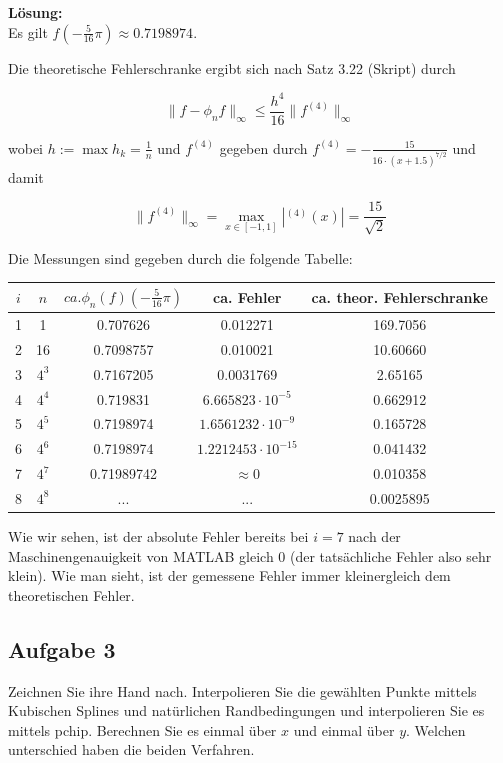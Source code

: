 \documentclass[11pt,a4paper,ngerman]{article}
\begin{document}
\textbf{Lösung:}\\
Es gilt $f(-\frac{5}{16} \pi) \approx 0.7198974$.

Die theoretische Fehlerschranke ergibt sich nach Satz 3.22 (Skript) durch

$$\| f - \phi_n f \|_{\infty} \leq \frac{h^4}{16} \|f^{(4)} \|_{\infty} $$

wobei $h := \max h_k = \frac{1}{n}$ und $f^{(4)}$ gegeben durch
$f^{(4)} = - \frac{15}{16 \cdot (x + 1.5)^{7/2}}$ und damit 

$$ \| f^{(4)} \|_{\infty} = \max_{x \in [-1,1]} |^{(4)}(x)| = \frac{15}{\sqrt{2}}$$


Die Messungen sind gegeben durch die folgende Tabelle:
\begin{center}
\begin{tabular}{c|c|c||c|c}
$i$ & $n$ & $ca. \phi_n(f)(-\frac{5}{16} \pi)$ & ca. Fehler & ca. theor. Fehlerschranke\\
\hline \hline
1 & 1 & 0.707626 & 0.012271 & 169.7056\\
2 & 16 & 0.7098757 & 0.010021 & 10.60660 \\
3 & $4^3$ &  0.7167205 &  0.0031769 & 2.65165 \\
4 & $4^4$ & 0.719831 & $6.665823\cdot 10^{-5}$ &  0.662912\\
5 & $4^5$ & 0.7198974 &  $1.6561232\cdot 10^{-9}$ & 0.165728 \\
6 & $4^6$ & 0.7198974 &  $1.2212453\cdot 10^{-15}$ & 0.041432\\
7 & $4^7$ &  0.71989742 & $\approx 0$ & 0.010358\\
8 & $4^8$ & ... & ...&  0.0025895
\end{tabular}
\end{center}

Wie wir sehen, ist der absolute Fehler bereits bei $i = 7$ nach der Maschinengenauigkeit von MATLAB gleich 0 (der tatsächliche Fehler also sehr klein). Wie man sieht, ist der gemessene Fehler immer kleinergleich dem theoretischen Fehler.

\subsection*{Aufgabe 3}
Zeichnen Sie ihre Hand nach. Interpolieren Sie die gewählten Punkte mittels Kubischen Splines und natürlichen Randbedingungen
und interpolieren Sie es mittels pchip. Berechnen Sie es einmal über $x$ und einmal über $y$. Welchen unterschied
haben die beiden Verfahren.\\
\end{document}
